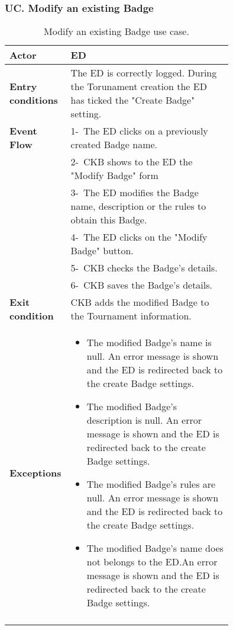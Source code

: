 \subsubsection*{UC\cuc . Modify an existing Badge}
\begin{center}
    \begin{longtable}{|l|p{0.75\linewidth}|}
        \hline
        \textbf{Actor}            & ED \\
        \hline
        \textbf{Entry conditions} & The ED is correctly logged. During the Torunament creation the ED has ticked the "Create Badge" setting.        \\
        \hline
        \textbf{Event Flow}       
        & 1-\ The ED clicks on a previously created Badge name. \\
        & 2-\ CKB shows to the ED the "Modify Badge" form \\
        & 3-\ The ED modifies the Badge name, description or the rules to obtain this Badge. \\
        & 4-\ The ED clicks on the "Modify Badge" button. \\
        & 5-\ CKB checks the Badge's details. \\
        & 6-\ CKB saves the Badge's details. \\
        \hline
        \textbf{Exit condition}   & CKB adds the modified Badge to the Tournament information. \\
        \hline
        \textbf{Exceptions}        & \begin{itemize}
            \item The modified Badge's name is null. An error message is shown and the ED is redirected back to the create Badge settings.
            \item The modified Badge's description is null. An error message is shown and the ED is redirected back to the create Badge settings.
            \item The modified Badge's rules are null. An error message is shown and the ED is redirected back to the create Badge settings.
            \item The modified Badge's name does not belongs to the ED.An error message is shown and the ED is redirected back to the create Badge settings.
         \end{itemize}    \\
        \hline
        \caption{ Modify an existing Badge use case.}
        \label{tab: modify_badge_use_case}
    \end{longtable}
\end{center}




